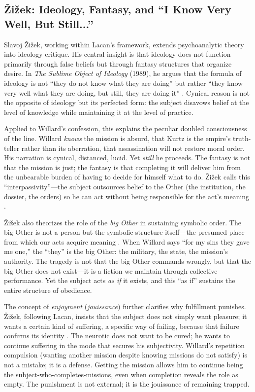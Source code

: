 \subsection*{{\v{Z}}i{\v{z}}ek: Ideology, Fantasy, and ``I Know Very Well, But Still...''}
\label{ssec:vi-zizek}

Slavoj {\v{Z}}i{\v{z}}ek, working within Lacan's framework, extends psychoanalytic theory into
ideology critique. His central insight is that ideology does not function primarily through
false beliefs but through fantasy structures that organize desire. In \textit{The Sublime
	Object of Ideology} (1989), he argues that the formula of ideology is not ``they do not know
what they are doing'' but rather ``they know very well what they are doing, but still, they
are doing it'' \parencite[p.~32]{ZizekSublime1999}. Cynical reason is not the opposite of
ideology but its perfected form: the subject disavows belief at the level of knowledge while
maintaining it at the level of practice.

Applied to Willard's confession, this explains the peculiar doubled consciousness of the line.
Willard \emph{knows} the mission is absurd, that Kurtz is the empire's truth-teller rather
than its aberration, that assassination will not restore moral order. His narration is cynical,
distanced, lucid. Yet \emph{still} he proceeds. The fantasy is not that the mission is just;
the fantasy is that completing it will deliver him from the unbearable burden of having to
decide for himself what to do. {\v{Z}}i{\v{z}}ek calls this ``interpassivity''---the subject
outsources belief to the Other (the institution, the dossier, the orders) so he can act
without being responsible for the act's meaning \parencite{ZizekSublime1999}.

{\v{Z}}i{\v{z}}ek also theorizes the role of the \emph{big Other} in sustaining symbolic
order. The big Other is not a person but the symbolic structure itself---the presumed place
from which our acts acquire meaning \parencite{ZizekSublime1999}. When Willard says ``for my
sins they gave me one,'' the ``they'' is the big Other: the military, the state, the mission's
authority. The tragedy is not that the big Other commands wrongly, but that the big Other does
not exist---it is a fiction we maintain through collective performance. Yet the subject acts
\emph{as if} it exists, and this ``as if'' sustains the entire structure of obedience.

The concept of \emph{enjoyment} (\emph{jouissance}) further clarifies why fulfillment
punishes. {\v{Z}}i{\v{z}}ek, following Lacan, insists that the subject does not simply want
pleasure; it wants a certain kind of suffering, a specific way of failing, because that failure
confirms its identity \parencite{ZizekSublime1999}. The neurotic does not want to be cured; he
wants to continue suffering in the mode that secures his subjectivity. Willard's repetition
compulsion (wanting another mission despite knowing missions do not satisfy) is not a mistake;
it is a defense. Getting the mission allows him to continue being the
subject-who-completes-missions,
even when completion reveals the role as empty. The punishment is not external; it is the
jouissance of remaining trapped.

